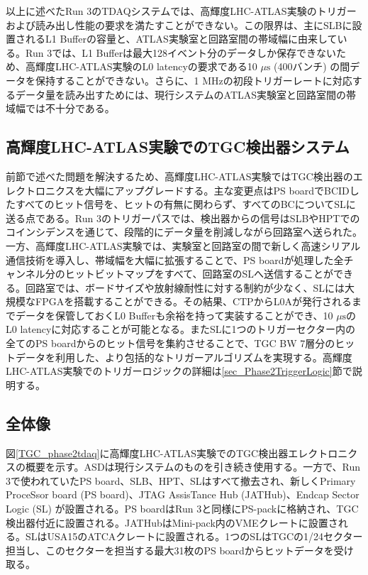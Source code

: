 以上に述べたRun 3のTDAQシステムでは、高輝度LHC-ATLAS実験のトリガーおよび読み出し性能の要求を満たすことができない。この限界は、主にSLBに設置されるL1 Bufferの容量と、ATLAS実験室と回路室間の帯域幅に由来している。Run 3では、L1 Bufferは最大128イベント分のデータしか保存できないため、高輝度LHC-ATLAS実験のL0 latencyの要求である10 $\mu \mathrm{s}$ (400バンチ) の間データを保持することができない。さらに、1 MHzの初段トリガーレートに対応するデータ量を読み出すためには、現行システムのATLAS実験室と回路室間の帯域幅では不十分である。

    \subsection{高輝度LHC-ATLAS実験でのTGC検出器システム}  
前節で述べた問題を解決するため、高輝度LHC-ATLAS実験ではTGC検出器のエレクトロニクスを大幅にアップグレードする。主な変更点はPS boardでBCIDしたすべてのヒット信号を、ヒットの有無に関わらず、すべてのBCについてSLに送る点である。Run 3のトリガーパスでは、検出器からの信号はSLBやHPTでのコインシデンスを通じて、段階的にデータ量を削減しながら回路室へ送られた。一方、高輝度LHC-ATLAS実験では、実験室と回路室の間で新しく高速シリアル通信技術を導入し、帯域幅を大幅に拡張することで、PS boardが処理した全チャンネル分のヒットビットマップをすべて、回路室のSLへ送信することができる。回路室では、ボードサイズや放射線耐性に対する制約が少なく、SLには大規模なFPGAを搭載することができる。その結果、CTPからL0Aが発行されるまでデータを保管しておくL0 Bufferも余裕を持って実装することができ、10 $\mu \mathrm{s}$のL0 latencyに対応することが可能となる。またSLに1つのトリガーセクター内の全てのPS boardからのヒット信号を集約させることで、TGC BW 7層分のヒットデータを利用した、より包括的なトリガーアルゴリズムを実現する。高輝度LHC-ATLAS実験でのトリガーロジックの詳細は\ref{sec_Phase2TriggerLogic}節で説明する。

\subsection*{全体像}
図\ref{TGC_phase2tdaq}に高輝度LHC-ATLAS実験でのTGC検出器エレクトロニクスの概要を示す。ASDは現行システムのものを引き続き使用する。一方で、Run 3で使われていたPS board、SLB、HPT、SLはすべて撤去され、新しくPrimary ProceSsor board  (PS board)、JTAG AssisTance Hub  (JATHub)、Endcap Sector Logic  (SL) が設置される。PS boardはRun 3と同様にPS-packに格納され、TGC検出器付近に設置される。JATHubはMini-pack内のVMEクレートに設置される。SLはUSA15のATCAクレートに設置される。1つのSLはTGCの1/24セクター担当し、このセクターを担当する最大31枚のPS boardからヒットデータを受け取る。

